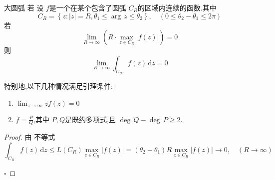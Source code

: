 \documentclass[../../复变函数.tex]{subfiles}
\begin{document}
\begin{lemma}{大圆弧}
    若 设 \(  f  \)是一个在某个包含了圆弧 \(  C_{R}  \)的区域内连续的函数.其中 \[
    C_{R}= \left\{ z: \left| z \right|= R,  \theta _1 \le \operatorname{arg}\,z\le  \theta _2   \right\},\quad \left( 0\le  \theta _2 - \theta _1 \le 2\pi  \right) 
    \] 若 \[
    \lim_{R\to \infty}\left( R\cdot \max _{z\in C_{R}}\left| f\left( z \right)  \right|  \right)=  0
    \]则 \[
    \lim_{R\to \infty}\int_{C_{R}}f\left( z \right)\,\mathrm{d} z= 0 
    \]
\end{lemma}
\begin{remark}
    特别地,以下几种情况满足引理条件:
    \begin{enumerate}
        \item  \(  \lim_{z\to \infty}zf\left( z \right)= 0   \) 
        \item \(  f= \frac{P }{Q }   \),其中 \(  P,Q  \)是既约多项式,且 \(  \operatorname{deg}\,Q-\operatorname{deg}\,P\ge 2  \).   
    \end{enumerate}
    
\end{remark}
\begin{proof}
    由 不等式 \[
    \int_{C_{R}}f\left( z \right)\,\mathrm{d} z\le L\left( C_{R} \right) \max _{z\in C_{R}}\left| f\left( z \right)  \right|=    \left(  \theta _2 - \theta _1  \right)R \max _{z\in C_{R}}\left| f\left( z \right)  \right|\to 0  ,\quad \left( R\to \infty \right) 
    \]

    \hfill $\square$
\end{proof}
\end{document}
